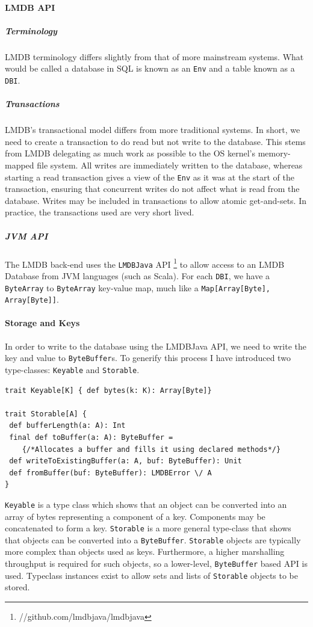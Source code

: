 \documentclass[12pt,a4paper,twoside,openright]{report}
\newcommand\codeName[1]{\texttt{#1}}
\newcommand\term[1]{\texttt{#1}}
\renewcommand{\baselinestretch}{1.1}    %
\begin{document}
		\paragraph{LMDB API}
			\subparagraph{Terminology}
			LMDB terminology differs slightly from that of more mainstream systems. What would be called a database in SQL is known as an \term{Env} and a table known as a \term{DBI}.
			\subparagraph{Transactions}
				LMDB's transactional model differs from more traditional systems. In short, we need to create a transaction to do read but not write to the database. This stems from LMDB delegating as much work as possible to the OS kernel's memory-mapped file system. All writes are immediately written to the database, whereas starting a read transaction gives a view of the \term{Env} as it was at the start of  the transaction, ensuring that concurrent writes do not affect what is read from the database. Writes may be included in transactions to allow atomic get-and-sets. In practice, the transactions used are very short lived.
			\subparagraph{JVM API}
			The LMDB back-end uses the \codeName{LMDBJava} API \footnote{//github.com/lmdbjava/lmdbjava} to allow access to an LMDB Database from JVM languages (such as Scala). For each \term{DBI}, we have a \codeName{ByteArray} to \codeName{ByteArray} key-value map, much like a \codeName{Map[Array[Byte], Array[Byte]]}.
			
		\paragraph{Storage and Keys}
			In order to write to the database using the LMDBJava API, we need to write the key and value to \codeName{ByteBuffer}s. To generify this process I have introduced two type-classes: \codeName{Keyable} and \codeName{Storable}.
			
\renewcommand{\baselinestretch}{0.8}
\begin{framed}
\begin{verbatim}
trait Keyable[K] { def bytes(k: K): Array[Byte]}

trait Storable[A] {
 def bufferLength(a: A): Int
 final def toBuffer(a: A): ByteBuffer = 
    {/*Allocates a buffer and fills it using declared methods*/}
 def writeToExistingBuffer(a: A, buf: ByteBuffer): Unit
 def fromBuffer(buf: ByteBuffer): LMDBError \/ A
}
\end{verbatim}
\end{framed}	
\renewcommand{\baselinestretch}{1.1}
		
\codeName{Keyable} is a type class which shows that an object can be converted into an array of bytes representing a component of a key. Components may be concatenated to form a key. \codeName{Storable} is a more general type-class that shows that objects can be converted into a \codeName{ByteBuffer}. \codeName{Storable} objects are typically more complex than objects used as keys. Furthermore, a higher marshalling throughput is required for such objects, so a lower-level, \codeName{ByteBuffer} based API is used. Typeclass instances exist to allow sets and lists of \codeName{Storable} objects to be stored.	
			
\end{document}
